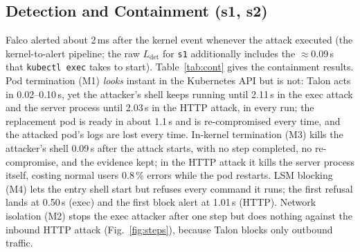 \documentclass[10pt,conference]{IEEEtran}
\begin{document}
\subsection{Detection and Containment (s1, s2)}
Falco alerted about 2\,ms after the kernel event whenever the attack executed (the kernel-to-alert pipeline; the raw $L_\text{det}$ for \texttt{s1} additionally includes the $\approx$0.09\,s that \texttt{kubectl exec} takes to start). Table~\ref{tab:cont} gives the containment results. Pod termination (M1) \emph{looks} instant in the Kubernetes API but is not: Talon acts in 0.02--0.10\,s, yet the attacker's shell keeps running until 2.11\,s in the exec attack and the server process until 2.03\,s in the HTTP attack, in every run; the replacement pod is ready in about 1.1\,s and is re-compromised every time, and the attacked pod's logs are lost every time. In-kernel termination (M3) kills the attacker's shell 0.09\,s after the attack starts, with no step completed, no re-compromise, and the evidence kept; in the HTTP attack it kills the server process itself, costing normal users 0.8\,\% errors while the pod restarts. LSM blocking (M4) lets the entry shell start but refuses every command it runs; the first refusal lands at 0.50\,s (exec) and the first block alert at 1.01\,s (HTTP). Network isolation (M2) stops the exec attacker after one step but does nothing against the inbound HTTP attack (Fig.~\ref{fig:steps}), because Talon blocks only outbound traffic.
\end{document}
